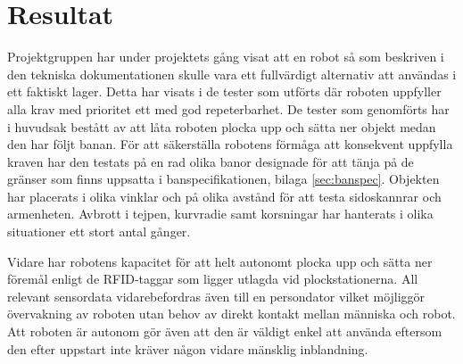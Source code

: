 
\section{Resultat}

Projektgruppen har under projektets gång visat att en robot så som beskriven i den tekniska dokumentationen skulle vara ett fullvärdigt alternativ att användas i ett faktiskt lager. Detta har visats i de tester som utförts där roboten uppfyller alla krav med prioritet ett med god repeterbarhet. De tester som genomförts har i huvudsak bestått av att låta roboten plocka upp och sätta ner objekt medan den har följt banan. För att säkerställa robotens förmåga att konsekvent uppfylla kraven har den testats på en rad olika banor designade för att tänja på de gränser som finns uppsatta i banspecifikationen, bilaga \ref{sec:banspec}. Objekten har placerats i olika vinklar och på olika avstånd för att testa sidoskannrar och armenheten. Avbrott i tejpen, kurvradie samt korsningar har hanterats i olika situationer ett stort antal gånger.

Vidare har robotens kapacitet för att helt autonomt plocka upp och sätta ner föremål enligt de RFID-taggar som ligger utlagda vid plockstationerna. All relevant sensordata vidarebefordras även till en persondator vilket möjliggör övervakning av roboten utan behov av direkt kontakt mellan människa och robot. Att roboten är autonom gör även att den är väldigt enkel att använda eftersom den efter uppstart inte kräver någon vidare mänsklig inblandning.
